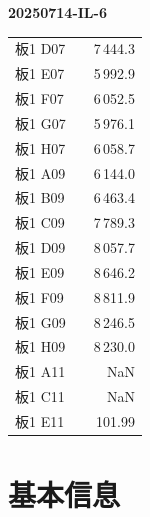 \documentclass[UTF8,10pt,a4paper,fontset=fandol]{ctexart}
\newcommand{\fieldvalue}[1]{#1}
\begin{document}

\newpage

\noindent\textbf{20250714-IL-6}

\begin{tabular}{llr}
板1 D07 & & %
\fieldvalue{7\,444.3}\\
板1 E07 & & %
\fieldvalue{5\,992.9}\\
板1 F07 & & %
\fieldvalue{6\,052.5}\\
板1 G07 & & %
\fieldvalue{5\,976.1}\\
板1 H07 & & %
\fieldvalue{6\,058.7}\\
板1 A09 & & %
\fieldvalue{6\,144.0}\\
板1 B09 & & %
\fieldvalue{6\,463.4}\\
板1 C09 & & %
\fieldvalue{7\,789.3}\\
板1 D09 & & %
\fieldvalue{8\,057.7}\\
板1 E09 & & %
\fieldvalue{8\,646.2}\\
板1 F09 & & %
\fieldvalue{8\,811.9}\\
板1 G09 & & %
\fieldvalue{8\,246.5}\\
板1 H09 & & %
\fieldvalue{8\,230.0}\\
板1 A11 & & %
\fieldvalue{NaN}\\
板1 C11 & & %
\fieldvalue{NaN}\\
板1 E11 & & %
\fieldvalue{101.99}
\end{tabular}

\section*{基本信息}
\end{document}
